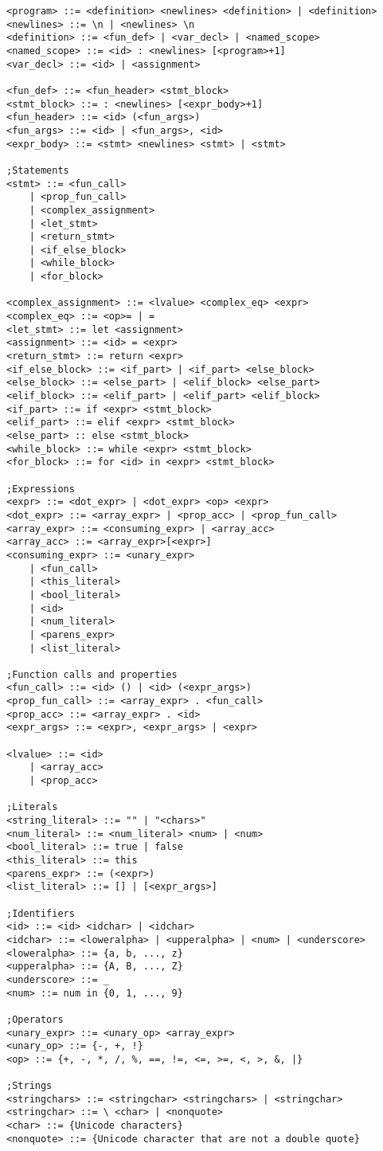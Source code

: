 \documentclass{article}
\begin{document}
\begin{lstlisting}[style=bnf]
<program> ::= <definition> <newlines> <definition> | <definition>
<newlines> ::= \n | <newlines> \n
<definition> ::= <fun_def> | <var_decl> | <named_scope>
<named_scope> ::= <id> : <newlines> [<program>+1]
<var_decl> ::= <id> | <assignment>

<fun_def> ::= <fun_header> <stmt_block>
<stmt_block> ::= : <newlines> [<expr_body>+1]
<fun_header> ::= <id> (<fun_args>)
<fun_args> ::= <id> | <fun_args>, <id>
<expr_body> ::= <stmt> <newlines> <stmt> | <stmt>

;Statements
<stmt> ::= <fun_call>
    | <prop_fun_call>
    | <complex_assignment>
    | <let_stmt>
    | <return_stmt>
    | <if_else_block>
    | <while_block>
    | <for_block>

<complex_assignment> ::= <lvalue> <complex_eq> <expr>
<complex_eq> ::= <op>= | =
<let_stmt> ::= let <assignment>
<assignment> ::= <id> = <expr>
<return_stmt> ::= return <expr>
<if_else_block> ::= <if_part> | <if_part> <else_block>
<else_block> ::= <else_part> | <elif_block> <else_part>
<elif_block> ::= <elif_part> | <elif_part> <elif_block>
<if_part> ::= if <expr> <stmt_block>
<elif_part> ::= elif <expr> <stmt_block>
<else_part> :: else <stmt_block>
<while_block> ::= while <expr> <stmt_block>
<for_block> ::= for <id> in <expr> <stmt_block>

;Expressions
<expr> ::= <dot_expr> | <dot_expr> <op> <expr>
<dot_expr> ::= <array_expr> | <prop_acc> | <prop_fun_call>
<array_expr> ::= <consuming_expr> | <array_acc>
<array_acc> ::= <array_expr>[<expr>]
<consuming_expr> ::= <unary_expr>
    | <fun_call>
    | <this_literal>
    | <bool_literal>
    | <id>
    | <num_literal>
    | <parens_expr>
    | <list_literal>

;Function calls and properties
<fun_call> ::= <id> () | <id> (<expr_args>)
<prop_fun_call> ::= <array_expr> . <fun_call>
<prop_acc> ::= <array_expr> . <id>
<expr_args> ::= <expr>, <expr_args> | <expr>

<lvalue> ::= <id>
    | <array_acc>
    | <prop_acc>

;Literals
<string_literal> ::= "" | "<chars>"
<num_literal> ::= <num_literal> <num> | <num>
<bool_literal> ::= true | false
<this_literal> ::= this
<parens_expr> ::= (<expr>)
<list_literal> ::= [] | [<expr_args>]

;Identifiers
<id> ::= <id> <idchar> | <idchar>
<idchar> ::= <loweralpha> | <upperalpha> | <num> | <underscore>
<loweralpha> ::= {a, b, ..., z}
<upperalpha> ::= {A, B, ..., Z}
<underscore> ::= _
<num> ::= num in {0, 1, ..., 9}

;Operators
<unary_expr> ::= <unary_op> <array_expr>
<unary_op> ::= {-, +, !}
<op> ::= {+, -, *, /, %, ==, !=, <=, >=, <, >, &, |}

;Strings
<stringchars> ::= <stringchar> <stringchars> | <stringchar>
<stringchar> ::= \ <char> | <nonquote>
<char> ::= {Unicode characters}
<nonquote> ::= {Unicode character that are not a double quote}
\end{lstlisting}
\end{document}
